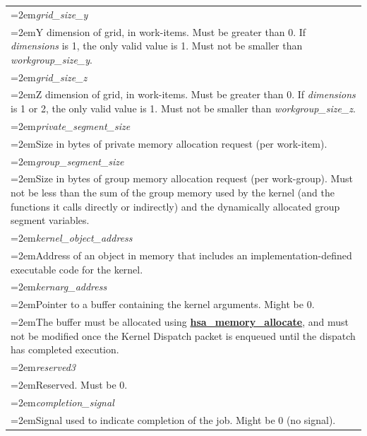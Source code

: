 \documentclass[final,oneside]{book}
\newcommand{\reffun}[1]{\textbf{#1}}
\newcommand{\reffld}[1]{\textit{#1}}
\begin{document}
\begin{longtable}{@{}>{\hangindent=2em}p{\textwidth}}
\hypertarget{hsa_\-kernel_\-dispatch_\-packet_\-t.grid_\-size_\-y}{\reffld{grid_\-size_\-y}}\\\hspace{2em}Y dimension of grid, in work-items. Must be greater than 0. If \textit{dimensions} is 1, the only valid value is 1. Must not be smaller than \textit{workgroup_\-size_\-y}.\\[2mm]
\hypertarget{hsa_\-kernel_\-dispatch_\-packet_\-t.grid_\-size_\-z}{\reffld{grid_\-size_\-z}}\\\hspace{2em}Z dimension of grid, in work-items. Must be greater than 0. If \textit{dimensions} is 1 or 2, the only valid value is 1. Must not be smaller than \textit{workgroup_\-size_\-z}.\\[2mm]
\hypertarget{hsa_\-kernel_\-dispatch_\-packet_\-t.private_\-segment_\-size}{\reffld{private_\-segment_\-size}}\\\hspace{2em}Size in bytes of private memory allocation request (per work-item).\\[2mm]
\hypertarget{hsa_\-kernel_\-dispatch_\-packet_\-t.group_\-segment_\-size}{\reffld{group_\-segment_\-size}}\\\hspace{2em}Size in bytes of group memory allocation request (per work-group). Must not be less than the sum of the group memory used by the kernel (and the functions it calls directly or indirectly) and the dynamically allocated group segment variables.\\[2mm]
\hypertarget{hsa_\-kernel_\-dispatch_\-packet_\-t.kernel_\-object_\-address}{\reffld{kernel_\-object_\-address}}\\\hspace{2em}Address of an object in memory that includes an implementation-defined executable code for the kernel.\\[2mm]
\hypertarget{hsa_\-kernel_\-dispatch_\-packet_\-t.kernarg_\-address}{\reffld{kernarg_\-address}}\\\hspace{2em}Pointer to a buffer containing the kernel arguments. Might be 0.\\
\hspace{2em}The buffer must be allocated using \hyperlink{group__memory_1ga39f7943b93aa2bb754726fc74d929426}{\reffun{hsa_\-memory_\-allocate}}, and must not be modified once the Kernel Dispatch packet is enqueued until the dispatch has completed execution.\\[2mm]
\hypertarget{hsa_\-kernel_\-dispatch_\-packet_\-t.reserved3}{\reffld{reserved3}}\\\hspace{2em}Reserved. Must be 0.\\[2mm]
\hypertarget{hsa_\-kernel_\-dispatch_\-packet_\-t.completion_\-signal}{\reffld{completion_\-signal}}\\\hspace{2em}Signal used to indicate completion of the job. Might be 0 (no signal).
\end{longtable}
\end{document}
